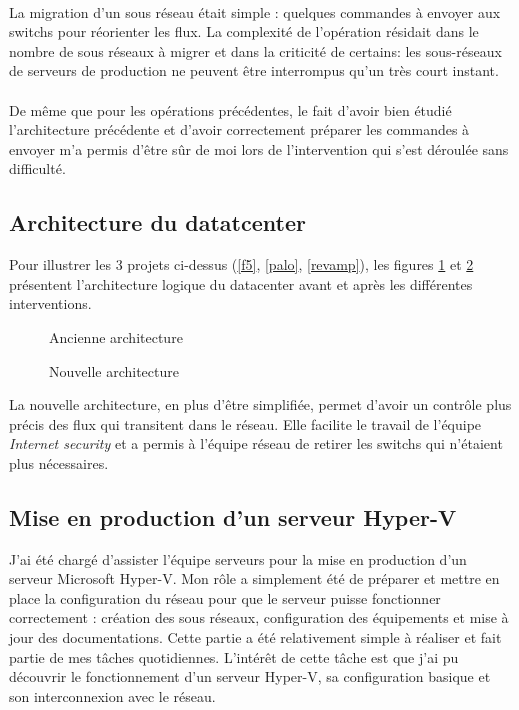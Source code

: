 \documentclass[a4paper,12pt]{report}
\begin{document}
\paragraph{}
La migration d'un sous réseau était simple : quelques commandes à envoyer aux switchs pour réorienter les flux. La complexité de l'opération résidait dans le nombre de sous réseaux à migrer et dans la criticité de certains: les sous-réseaux de serveurs de production ne peuvent être interrompus qu'un très court instant.
\paragraph{}
De même que pour les opérations précédentes, le fait d'avoir bien étudié l'architecture précédente et d'avoir correctement préparer les commandes à envoyer m'a permis d'être sûr de moi lors de l'intervention qui s'est déroulée sans difficulté.

\subsection{Architecture du datatcenter}
Pour illustrer les 3 projets ci-dessus (\ref{f5}, \ref{palo}, \ref{revamp}), les figures \ref{fw_old} et \ref{fw_new} présentent l'architecture logique du datacenter avant et après les différentes interventions.
\begin{figure}
\caption{Ancienne architecture}
\label{fw_old}
\end{figure}
\begin{figure}
\caption{Nouvelle architecture}
\label{fw_new}
\end{figure}
La nouvelle architecture, en plus d'être simplifiée, permet d'avoir un contrôle plus précis des flux qui transitent dans le réseau. Elle facilite le travail de l'équipe \textit{Internet security} et a permis à l'équipe réseau de retirer les switchs qui n'étaient plus nécessaires.

\subsection{Mise en production d'un serveur Hyper-V}
J'ai été chargé d'assister l'équipe serveurs pour la mise en production d'un serveur Microsoft Hyper-V. Mon rôle a simplement été de préparer et mettre en place la configuration du réseau pour que le serveur puisse fonctionner correctement : création des sous réseaux, configuration des équipements et mise à jour des documentations. Cette partie a été relativement simple à réaliser et fait partie de mes tâches quotidiennes. L'intérêt de cette tâche est que j'ai pu découvrir le fonctionnement d'un serveur Hyper-V, sa configuration basique et son interconnexion avec le réseau.
\end{document}
